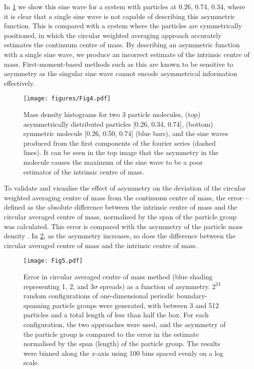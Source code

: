 \documentclass[reprint,superscriptaddress,nobibnotes,amsmath,amssymb,aip]{revtex4-2}
\begin{document}
In \cref{fig:sine_wave_assym} we show this sine wave for a system with particles at 0.26, 0.74, 0.34, where it is clear that a single sine wave is not capable of describing this asymmetric function. 
This is compared with a system where the particles are symmetrically positioned, in which the circular weighted averaging approach accurately estimates the continuum centre of mass. 
By describing an asymmetric function with a single sine wave, we produce an incorrect estimate of the intrinsic centre of mass. 
First-moment-based methods such as this are known to be sensitive to asymmetry \cite{teague_robust_2018} as the singular sine wave cannot encode asymmetrical information effectively. 
%
\begin{figure}
    \centering
    \texttt{[image: figures/Fig4.pdf]}
    \caption{Mass density histograms for two 3 particle molecules, (top) asymmetrically distributed particles [0.26, 0.34, 0.74], (bottom) symmetric molecule [0.26, 0.50, 0.74] (blue bars), and the sine waves produced from the first components of the fourier series (dashed lines). It can be seen in the top image that the asymmetry in the molecule causes the maximum of the sine wave to be a poor estimator of the intrinsic centre of mass. }
    \label{fig:sine_wave_assym}
\end{figure}
%

To validate and visualise the effect of asymmetry on the deviation of the circular weighted averaging centre of mass from the continuum centre of mass, the error—defined as the absolute difference between the intrinsic centre of mass and the circular averaged centre of mass, normalised by the span of the particle group was calculated.
This error is compared with the asymmetry of the particle mass density \cite{xioajun_on_1991}. 
In \cref{fig:method_comparison}, as the asymmetry increases, so does the difference between the circular averaged centre of mass and the intrinsic centre of mass. 
%
\begin{figure}
    \centering
    \texttt{[image: Fig5.pdf]}
    \caption{Error in circular averaged centre of mass method (blue shading representing 1, 2, and 3$\sigma$ spreads) as a function of asymmetry.
    $2^{24}$ random configurations of one-dimensional periodic boundary-spanning particle groups were generated, with between 3 and 512 particles and a total length of less than half the box. 
    For each configuration, the two approaches were used, and the asymmetry of the particle group\cite{xioajun_on_1991} is compared to the error in the estimate normalised by the span (length) of the particle group. 
    The results were binned along the $x$-axis using 100 bins spaced evenly on a log scale.}
    \label{fig:method_comparison}
\end{figure}


\end{document}
